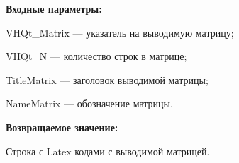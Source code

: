 \textbf{Входные параметры:}

VHQt\_Matrix --- указатель на выводимую матрицу;
 
VHQt\_N --- количество строк в матрице;
 
TitleMatrix --- заголовок выводимой матрицы;
 
NameMatrix --- обозначение матрицы.
	
\textbf{Возвращаемое значение:}

Строка с Latex кодами с выводимой матрицей.